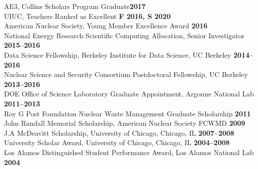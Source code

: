 \documentclass[margin,line]{resume}
\begin{document}
\begin{resume}
                AE3, Collins Scholars Program Graduate\hfill \textbf{2017}\vspace{.5mm}\\%
                UIUC, Teachers Ranked as Excellent \hfill \textbf{F 2016, S 2020}\vspace{.5mm}\\%
                American Nuclear Society, Young Member Excellence Award                         \hfill \textbf{2016}\vspace{.5mm}\\%
                National Energy Research Scientific Computing Allocation, Senior Investigator     \hfill \textbf{2015--2016}\vspace{.5mm}\\%
                Data Science Fellowship, Berkeley Institute for Data Science, UC Berkeley     \hfill \textbf{2014--2016}\vspace{.5mm}\\%
                Nuclear Science and Security Consortium Postdoctoral Fellowship, UC Berkeley  \hfill \textbf{2013--2016}\vspace{.5mm}\\%
                DOE Office of Science Laboratory Graduate Appointment, Argonne National Lab   \hfill \textbf{2011--2013}\vspace{.5mm}\\%
                Roy G  Post Foundation Nuclear Waste Management Graduate Scholarship                \hfill \textbf{2011}\vspace{.5mm}\\%
                John Randall Memorial Scholarship, American Nuclear Society FCWMD                   \hfill \textbf{2009}\vspace{.5mm}\\%
                J.A  McDeavitt Scholarship, University of Chicago, Chicago, IL                 \hfill\textbf{2007--2008}\vspace{.5mm}\\%
                University Scholar Award, University of Chicago, Chicago, IL                   \hfill\textbf{2004--2008}\vspace{.5mm}\\%
                Los Alamos Distinguished Student Performance Award, Los Alamos National Lab                         \hfill\textbf{2004}%

\end{resume}
\end{document}
